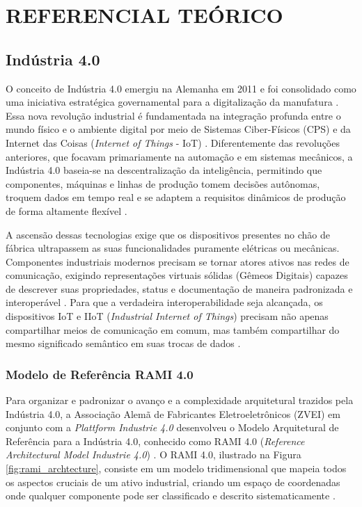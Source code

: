 \chapter{REFERENCIAL TEÓRICO}

\section{Indústria 4.0}

O conceito de Indústria 4.0 emergiu na Alemanha em 2011 e foi consolidado como uma iniciativa estratégica governamental para a digitalização da manufatura \cite{kagermann2013}. Essa nova revolução industrial é fundamentada na integração profunda entre o mundo físico e o ambiente digital por meio de Sistemas Ciber-Físicos (CPS) e da Internet das Coisas (\textit{Internet of Things} - IoT) \cite{gubbi2013}. Diferentemente das revoluções anteriores, que focavam primariamente na automação e em sistemas mecânicos, a Indústria 4.0 baseia-se na descentralização da inteligência, permitindo que componentes, máquinas e linhas de produção tomem decisões autônomas, troquem dados em tempo real e se adaptem a requisitos dinâmicos de produção de forma altamente flexível \cite{kagermann2013}.

A ascensão dessas tecnologias exige que os dispositivos presentes no chão de fábrica ultrapassem as suas funcionalidades puramente elétricas ou mecânicas. Componentes industriais modernos precisam se tornar atores ativos nas redes de comunicação, exigindo representações virtuais sólidas (Gêmeos Digitais) capazes de descrever suas propriedades, status e documentação de maneira padronizada e interoperável \cite{olaya2025}. Para que a verdadeira interoperabilidade seja alcançada, os dispositivos IoT e IIoT (\textit{Industrial Internet of Things}) precisam não apenas compartilhar meios de comunicação em comum, mas também compartilhar do mesmo significado semântico em suas trocas de dados \cite{pribis2021}. 

\subsection{Modelo de Referência RAMI 4.0}

Para organizar e padronizar o avanço e a complexidade arquitetural trazidos pela Indústria 4.0, a Associação Alemã de Fabricantes Eletroeletrônicos (ZVEI) em conjunto com a \textit{Plattform Industrie 4.0} desenvolveu o Modelo Arquitetural de Referência para a Indústria 4.0, conhecido como RAMI 4.0 (\textit{Reference Architectural Model Industrie 4.0}) \cite{zvei2015}. O RAMI 4.0, ilustrado na Figura \ref{fig:rami_archtecture}, consiste em um modelo tridimensional que mapeia todos os aspectos cruciais de um ativo industrial, criando um espaço de coordenadas onde qualquer componente pode ser classificado e descrito sistematicamente \cite{plattform2016}.


